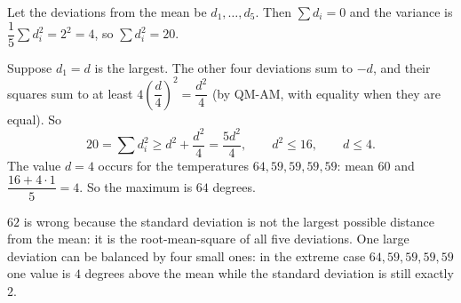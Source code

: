 Let the deviations from the mean be $d_1,\dots,d_5$. Then $\sum d_i=0$ and the variance is $\dfrac{1}{5}\sum d_i^2=2^2=4$, so $\sum d_i^2=20$.

Suppose $d_1=d$ is the largest. The other four deviations sum to $-d$, and their squares sum to at least $4\left(\dfrac{d}{4}\right)^2=\dfrac{d^2}{4}$ (by QM-AM, with equality when they are equal). So
\[
20=\sum d_i^2\ge d^2+\dfrac{d^2}{4}=\dfrac{5d^2}{4},\qquad d^2\le16,\qquad d\le4 .
\]
The value $d=4$ occurs for the temperatures $64,59,59,59,59$: mean $60$ and $\dfrac{16+4\cdot1}{5}=4$. So the maximum is $\boxed{64}$ degrees.

$62$ is wrong because the standard deviation is not the largest possible distance from the mean: it is the root-mean-square of all five deviations. One large deviation can be balanced by four small ones: in the extreme case $64,59,59,59,59$ one value is $4$ degrees above the mean while the standard deviation is still exactly $2$.
